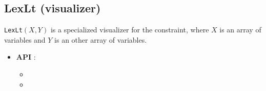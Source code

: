 \subsection{LexLt (visualizer)}\label{lexlt:visu}\hypertarget{lexlt:visu}{}
\begin{notedef}
  \texttt{LexLt}$(X, Y)$ is a specialized visualizer for the  constraint, where $X$ is an array of variables and $Y$ is an other array of variables.
\end{notedef}

\begin{itemize}
	\item \textbf{API} : 
	\begin{itemize}
	\item {}
	\item {}
	\end{itemize}
\end{itemize}

%

